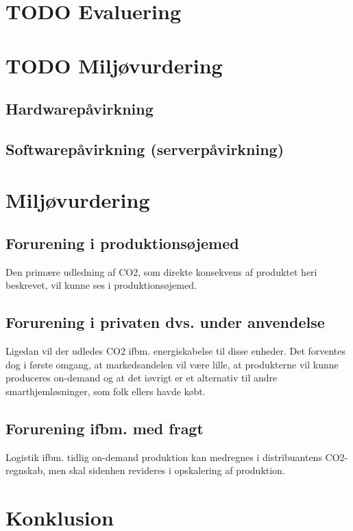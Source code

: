\documentclass[11pt]{article}
\begin{document}
\section{{\bfseries\sffamily TODO} Evaluering}
\label{sec:org4ddb451}
\section{{\bfseries\sffamily TODO} Miljøvurdering}
\label{sec:org9bb106c}
\subsection{Hardwarepåvirkning}
\label{sec:org9e89a3f}
\subsection{Softwarepåvirkning (serverpåvirkning)}
\label{sec:org15c2cb6}

\newpage
\section{Miljøvurdering}
\label{sec:miljoevurdering}
\subsection{Forurening i produktionsøjemed}
Den primære udledning af CO2, som direkte konsekvens af produktet heri beskrevet, vil kunne ses i produktionsøjemed.
\subsection{Forurening i privaten dvs. under anvendelse}
Ligedan vil der udledes CO2 ifbm. energiskabelse til disse enheder. Det forventes dog i første omgang, at markedsandelen vil være lille, at produkterne vil kunne produceres on-demand og at det iøvrigt er et alternativ til andre smarthjemløsninger, som folk ellers havde købt.
\subsection{Forurening ifbm. med fragt}
Logistik ifbm. tidlig on-demand produktion kan medregnes i distribuantens CO2-regnskab, men skal sidenhen revideres i opskalering af produktion. 

\newpage
\section{Konklusion}
\label{sec:org7454aed}

\newpage
\printbibliography
\end{document}
